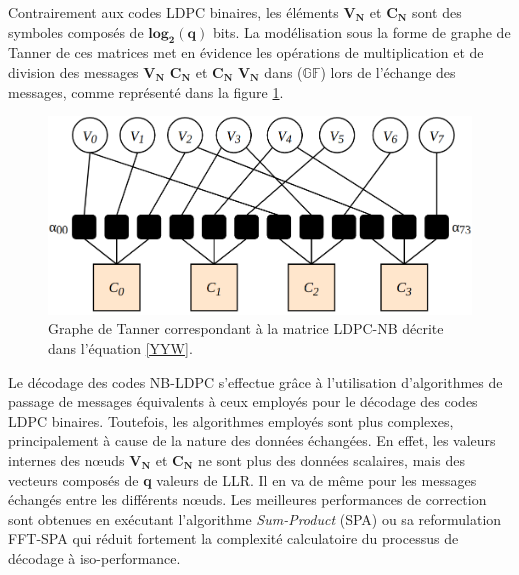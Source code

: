 \documentclass[../main.tex]{subfiles}
\begin{document}
Contrairement aux codes LDPC binaires, les éléments $\bm{V_N}$ et $\bm{C_N}$ sont des symboles composés de $\bm{log_2(q)}$ bits. La modélisation sous la forme de graphe de Tanner de ces matrices met en évidence les opérations de multiplication et de division des messages $\bm{V_N}$ \rightarrow $\bm{C_N}$ et $\bm{C_N}$ \rightarrow $\bm{V_N}$ dans ($\mathbb{GF}$) lors de l’échange des messages, comme représenté dans la figure \ref{YYZ}.

\begin{figure}
    \centering
    \includegraphics[scale=0.3]{chapter2/figs/yyz.png}
    \caption{Graphe de Tanner correspondant à la matrice LDPC-NB décrite dans l’équation \ref{YYW}.}
    \label{YYZ}
\end{figure}

Le décodage des codes NB-LDPC s’effectue grâce à l’utilisation d'algorithmes de passage de messages équivalents à ceux employés pour le décodage des codes LDPC binaires. Toutefois, les algorithmes employés sont plus complexes, principalement à cause de la nature des données échangées. En effet, les valeurs internes des nœuds $\bm{V_N}$ et $\bm{C_N}$ ne sont plus des données scalaires, mais des vecteurs composés de \textbf{q} valeurs de LLR. Il en va de même pour les messages échangés entre les différents nœuds. Les meilleures performances de correction sont obtenues en exécutant l'algorithme \textit{Sum-Product} (SPA) \cite{NB:SPA} ou sa reformulation FFT-SPA \cite{NB:SPA} qui réduit fortement la complexité calculatoire du processus de décodage à iso-performance.



\end{document}
